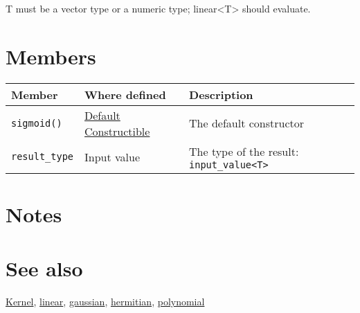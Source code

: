 \documentclass{article}
\begin{document}
T must be a vector type or a numeric type; linear<T> should evaluate.


\section*{Members}

\begin{tabular}{lll}
\textbf{Member} & \textbf{Where defined} & \textbf{Description} \\ 
\hline
\texttt{sigmoid()} & \href{http://www.sgi.com/tech/stl/DefaultConstructible.html}{Default Constructible} & The default constructor \\
\texttt{result_type} & Input value & The type of the result: \texttt{input_value<T>} \\
\end{tabular}

\section*{Notes}

\section*{See also}

\href{\kmlroot/kernel.html}{Kernel},
\href{\kmlroot/linear.html}{linear},
\href{\kmlroot/gaussian.html}{gaussian},
\href{\kmlroot/hermitian.html}{hermitian},
\href{\kmlroot/polynomial.html}{polynomial}



\end{document}
